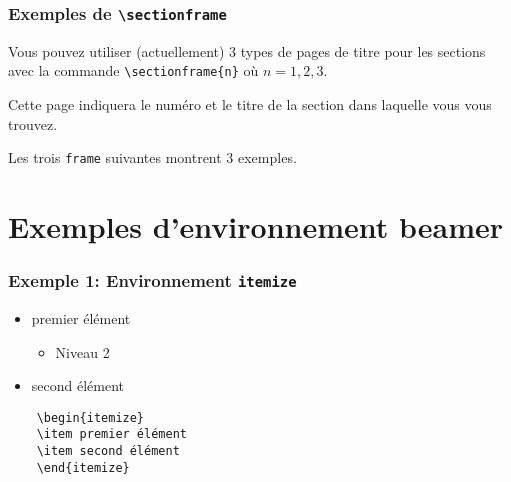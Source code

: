 \documentclass[aspectratio=169]{beamer}
\begin{document}
\begin{frame} 
    \frametitle{Exemples de \texttt{\textbackslash sectionframe}}

    Vous pouvez utiliser (actuellement) 3 types de pages de titre pour
    les sections avec la commande \texttt{\textbackslash sectionframe\{n\}} 
    où $n=1,2,3$.\newline

    Cette page indiquera le numéro et le titre de la section dans laquelle
    vous vous trouvez.\newline

    Les trois \texttt{frame} suivantes montrent 3 exemples.
\end{frame}

\section{Exemples d'environnement beamer}

\begin{frame}[fragile]
    \frametitle{Exemple 1: Environnement \texttt{itemize}}
\begin{itemize}
    \item premier élément 
        \begin{itemize}
            \item Niveau 2
        \end{itemize}
    \item second élément
\end{itemize}
\begin{verbatim}
    \begin{itemize}
    \item premier élément 
    \item second élément
    \end{itemize}
\end{verbatim}
\end{frame}
\end{document}
